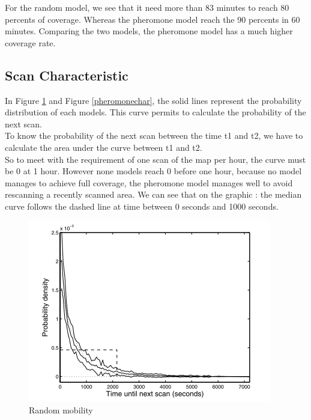 For the random model, we see that it need more than 83 minutes to reach 80 percents of coverage. Whereas the pheromone model reach the 90 percents in 60 minutes. Comparing the two models, the pheromone model has a much higher coverage rate.

\subsection{Scan Characteristic}

In Figure \ref{randomchar} and Figure \ref{pheromonechar}, the solid lines represent the probability distribution of each models. This curve permits to calculate the probability of the next scan.\\
To know the probability of the next scan between the time t1 and t2, we have to calculate the area under the curve between t1 and t2.\\
So to meet with the requirement of one scan of the map per hour, the curve must be 0 at 1 hour. However none models reach 0 before one hour, because no model manages to achieve full coverage, the pheromone model manages well to avoid rescanning a recently scanned area. We can see that on the graphic : the median curve follows the dashed line at time between 0 seconds and 1000 seconds.

\newpage

\begin{figure}[!h]
\caption{\label{randomchar} Random mobility}
   \includegraphics{../images/random_scan_characteristic.png}
\end{figure}

